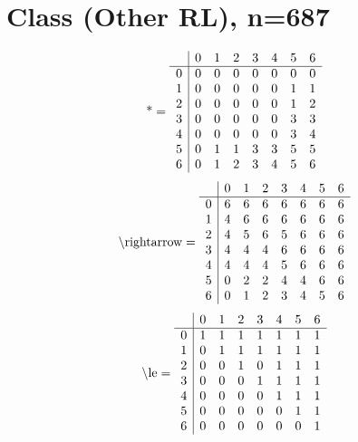 \documentclass[11pt]{article}
\begin{document}
\section{Class (Other RL), n=687}
\[\text{*} = 
\begin{array}{r | r r r r r r r}
 & 0 & 1 & 2 & 3 & 4 & 5 & 6 \\ \hline
0 & 0 & 0 & 0 & 0 & 0 & 0 & 0 \\
1 & 0 & 0 & 0 & 0 & 0 & 1 & 1 \\
2 & 0 & 0 & 0 & 0 & 0 & 1 & 2 \\
3 & 0 & 0 & 0 & 0 & 0 & 3 & 3 \\
4 & 0 & 0 & 0 & 0 & 0 & 3 & 4 \\
5 & 0 & 1 & 1 & 3 & 3 & 5 & 5 \\
6 & 0 & 1 & 2 & 3 & 4 & 5 & 6 \\
\end{array}
\]
\[\text{\textbackslash rightarrow} = 
\begin{array}{r | r r r r r r r}
 & 0 & 1 & 2 & 3 & 4 & 5 & 6 \\ \hline
0 & 6 & 6 & 6 & 6 & 6 & 6 & 6 \\
1 & 4 & 6 & 6 & 6 & 6 & 6 & 6 \\
2 & 4 & 5 & 6 & 5 & 6 & 6 & 6 \\
3 & 4 & 4 & 4 & 6 & 6 & 6 & 6 \\
4 & 4 & 4 & 4 & 5 & 6 & 6 & 6 \\
5 & 0 & 2 & 2 & 4 & 4 & 6 & 6 \\
6 & 0 & 1 & 2 & 3 & 4 & 5 & 6 \\
\end{array}
\]
\[\text{\textbackslash le} = 
\begin{array}{r | r r r r r r r}
 & 0 & 1 & 2 & 3 & 4 & 5 & 6 \\ \hline
0 & 1 & 1 & 1 & 1 & 1 & 1 & 1 \\
1 & 0 & 1 & 1 & 1 & 1 & 1 & 1 \\
2 & 0 & 0 & 1 & 0 & 1 & 1 & 1 \\
3 & 0 & 0 & 0 & 1 & 1 & 1 & 1 \\
4 & 0 & 0 & 0 & 0 & 1 & 1 & 1 \\
5 & 0 & 0 & 0 & 0 & 0 & 1 & 1 \\
6 & 0 & 0 & 0 & 0 & 0 & 0 & 1 \\
\end{array}
\]
\end{document}
